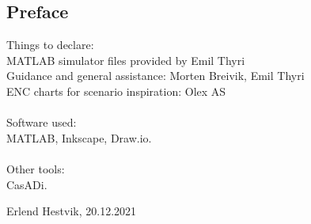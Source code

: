 \newpage
\begin{centering}
\section*{Preface}
Things to declare:\hfill\\
MATLAB simulator files provided by Emil Thyri\\
Guidance and general assistance: Morten Breivik, Emil Thyri\\
ENC charts for scenario inspiration: Olex AS\\
\hfill\\
Software used:\\
MATLAB, Inkscape, Draw.io.\\
\hfill\\
Other tools:\\
CasADi.


\end{centering}
\begin{center}
    Erlend Hestvik, 20.12.2021
\end{center}

\afterpage{\blankpage}